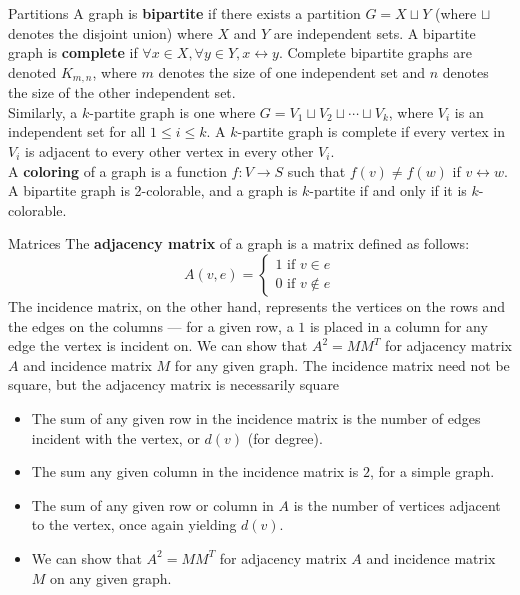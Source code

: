 \documentclass[10pt]{extarticle}
\begin{document}
\begin{problem}{Partitions}
  A graph is \textbf{bipartite} if there exists a partition $G = X\sqcup Y$ (where $\sqcup$ denotes the disjoint union) where $X$ and $Y$ are independent sets. A bipartite graph is \textbf{complete} if $\forall x\in X, \forall y\in Y, x\leftrightarrow y$. Complete bipartite graphs are denoted $K_{m,n}$, where $m$ denotes the size of one independent set and $n$ denotes the size of the other independent set.\\

  Similarly, a $k$-partite graph is one where $G = V_1\sqcup V_2\sqcup \cdots \sqcup V_k$, where $V_i$ is an independent set for all $1\leq i\leq k$. A $k$-partite graph is complete if every vertex in $V_i$ is adjacent to every other vertex in every other $V_i$.\\

  A \textbf{coloring} of a graph is a function $f: V\rightarrow S$ such that $f(v) \neq f(w)$ if $v\leftrightarrow w$. A bipartite graph is 2-colorable, and a graph is $k$-partite if and only if it is $k$-colorable.\\
\end{problem}
\begin{problem}{Matrices}
  The \textbf{adjacency matrix} of a graph is a matrix defined as follows:
  \[
    A(v,e) = \begin{cases}
      1\textrm{ if } v\in e\\
      0\textrm{ if } v\notin e
    \end{cases}
  \]
  The incidence matrix, on the other hand, represents the vertices on the rows and the edges on the columns --- for a given row, a $1$ is placed in a column for any edge the vertex is incident on. We can show that $A^2 = MM^T$ for adjacency matrix $A$ and incidence matrix $M$ for any given graph. The incidence matrix need not be square, but the adjacency matrix is necessarily square

  \begin{itemize}
    \item The sum of any given row in the incidence matrix is the number of edges incident with the vertex, or $d(v)$ (for degree).
    \item The sum any given column in the incidence matrix is $2$, for a simple graph.
    \item The sum of any given row or column in $A$ is the number of vertices adjacent to the vertex, once again yielding $d(v)$.
    \item We can show that $A^2 = MM^T$ for adjacency matrix $A$ and incidence matrix $M$ on any given graph.
  \end{itemize}
\end{problem}
\end{document}

